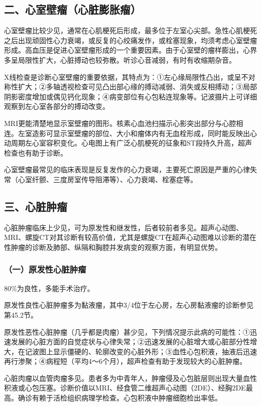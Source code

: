 \subsection{二、心室壁瘤（心脏膨胀瘤）}

心室壁瘤比较少见，通常在心肌梗死后形成，最多位于左室心尖部。急性心肌梗死之后出现顽固性心力衰竭，或反复的心绞痛发作，或栓塞现象，均须考虑心室壁瘤形成。高血压是促进心室壁瘤形成的一个重要因素。由于心室壁的瘤样膨出，心界多呈局限性扩大，心脏搏动也较弥散。听诊心音减弱，有时有收缩期杂音。

X线检查是诊断心室壁瘤的重要依据，其特点为：①左心缘局限性凸出，或呈不对称性扩大；②多轴透视检查可见凸出部心缘的搏动减弱、消失或反相搏动；③局部阴影密度增加或偶见钙化现象；④病变部位有心包粘连现象等。记波摄片上可详细观察到左心室各部分的搏动改变。

MRI更能清楚地显示室壁瘤的图形。核素心血池扫描示心影突出部分与心腔相连。左室造影可显示室壁瘤的部位、大小和瘤体内有无血栓形成，同时能反映出心动周期左心室容积变化。心电图上有广泛心肌梗死的征象和ST段持久升高，超声检查也有助于诊断。

心室壁瘤最常见的临床表现是反复发作的心力衰竭，主要死亡原因是严重的心律失常（心室纤颤、三度房室传导阻滞等）、心力衰竭、栓塞症等。

\subsection{三、心脏肿瘤}

心脏肿瘤临床上少见，可为原发性和继发性，后者较前者多见。超声心动图、MRI、螺旋CT对其诊断有较高价值，尤其是螺旋CT在超声心动图难以诊断的潜在性肿瘤的诊断及肺部、纵隔和胸腔并发病变的观察方面，有明显优势。

\subsubsection{（一）原发性心脏肿瘤}

80\%为良性，多能手术治疗。

原发性良性心脏肿瘤多为黏液瘤，其中3/4位于左心房，左心房黏液瘤的诊断参见第45.2节。

原发性恶性心脏肿瘤（几乎都是肉瘤）甚少见，下列情况提示此病的可能性：①迅速发展的心脏方面的自觉症状与心律失常；②迅速发展的心脏增大或心脏部分性增大，在记波图上显示僵硬的、轮廓改变的心脏外形；③血性心包积液，抽液后迅速再行渗聚；④病程短（平均4～6个月），超声检查有助于发现较大的心脏肿瘤。

心脏肉瘤以血管肉瘤多见。患者多为中青年人，肿瘤侵及心包脏层则出现大量血性积液或心包压塞。诊断价值以MRI、经食管二维超声心动图（2DE）、经胸2DE最高。确诊有赖于活检组织病理学检查。心包积液中肿瘤细胞检出率低。

